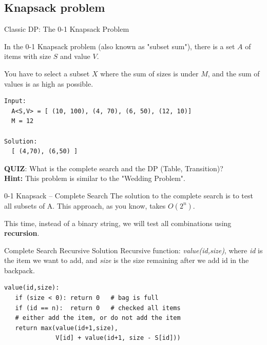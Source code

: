 \subsection{Knapsack problem}
\begin{frame}[fragile]{Classic DP: The 0-1 Knapsack Problem}

  In the 0-1 Knapsack problem (also known as "subset sum"), there is a set $A$ of items with size $S$ and value $V$.\bigskip

  You have to select a subset $X$ where the sum of sizes is under $M$, and the sum of values is as high as possible.\bigskip

\begin{verbatim}
Input:
  A<S,V> = [ (10, 100), (4, 70), (6, 50), (12, 10)]
  M = 12

Solution:
  [ (4,70), (6,50) ]
\end{verbatim}\bigskip

{\bf QUIZ}: What is the complete search and the DP (Table, Transition)?\\
{\bf Hint:} This problem is similar to the "Wedding Problem".
\end{frame}

\begin{frame}[fragile]{0-1 Knapsack -- Complete Search}
  The solution to the complete search is to test all subsets of A. This approach, as you know, takes $O(2^n)$.\bigskip

  This time, instead of a binary string, we will test all combinations using {\bf recursion}.

  \begin{block}{Complete Search Recursive Solution}
    Recursive function: \emph{value(id,size)}, where \emph{id} is the item we want to add, and \emph{size} is the size remaining after we add id in the backpack.\medskip

\begin{verbatim}
value(id,size):
   if (size < 0): return 0   # bag is full
   if (id == n):  return 0   # checked all items
   # either add the item, or do not add the item
   return max(value(id+1,size),
              V[id] + value(id+1, size - S[id]))
\end{verbatim}
  \end{block}
\end{frame}


